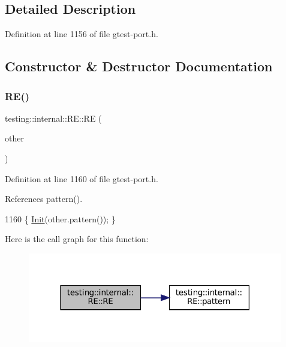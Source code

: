 \subsection{Detailed Description}


Definition at line 1156 of file gtest-\/port.\+h.



\subsection{Constructor \& Destructor Documentation}
\mbox{\label{classtesting_1_1internal_1_1RE_ab215dbc2565fce641e1746ca43e9d68a}} 
\subsubsection{\texorpdfstring{R\+E()}{RE()}\hspace{0.1cm}{\footnotesize\ttfamily [1/3]}}
{\footnotesize\ttfamily testing\+::internal\+::\+R\+E\+::\+RE (\begin{DoxyParamCaption}\item[{const \hyperlink{classtesting_1_1internal_1_1RE}{RE} \&}]{other }\end{DoxyParamCaption})\hspace{0.3cm}{\ttfamily [inline]}}



Definition at line 1160 of file gtest-\/port.\+h.



References pattern().


\begin{DoxyCode}
1160 \{ \hyperlink{classtesting_1_1internal_1_1RE_a4c3a519ce849abc57d6d5fffbf1e04dc}{Init}(other.pattern()); \}
\end{DoxyCode}
Here is the call graph for this function\+:
\nopagebreak
\begin{figure}[H]
\begin{center}
\leavevmode
\includegraphics[width=316pt]{classtesting_1_1internal_1_1RE_ab215dbc2565fce641e1746ca43e9d68a_cgraph}
\end{center}
\end{figure}
\mbox{\label{classtesting_1_1internal_1_1RE_a8840bd639642f3d4769a94a68ce463c2}} 
